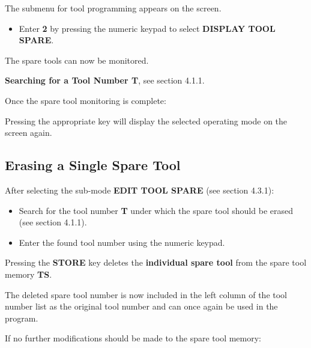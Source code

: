 The submenu for tool programming appears on the screen.

\begin{itemize}
    \item Enter \textbf{2} by pressing the numeric keypad to select \textbf{DISPLAY TOOL SPARE}.
\end{itemize}

The spare tools can now be monitored.

\textbf{Searching for a Tool Number T}, see section 4.1.1.

Once the spare tool monitoring is complete:

\begin{itemize}
\end{itemize}

Pressing the appropriate key will display the selected operating mode on the screen again.

\subsection{Erasing a Single Spare Tool}

After selecting the sub-mode \textbf{EDIT TOOL SPARE} (see section 4.3.1):

\begin{itemize}
    \item Search for the tool number \textbf{T} under which the spare tool should be erased (see section 4.1.1).
    \item Enter the found tool number using the numeric keypad.
    \vspace{.6cm}
    \vspace{.6cm}
\end{itemize}

Pressing the \textbf{STORE} key deletes the \textbf{individual spare tool} from the spare tool memory \textbf{TS}.

The deleted spare tool number is now included in the left column of the tool number list as the original tool number and can once again be used in the program.

If no further modifications should be made to the spare tool memory:

